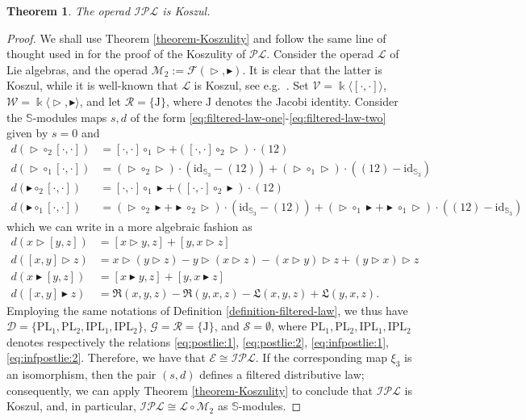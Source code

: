 \documentclass[10pt]{article}
\newtheorem {theorem} [lemma] {Theorem}
\theoremstyle{definition}
\newcommand{\wt}{\vartriangleright}
\newcommand{\bt}{\blacktriangleright}
\newcommand{\R}{\mathfrak{R}}
\renewcommand{\L}{\mathfrak{L}}
\begin{document}
\begin{theorem}\label{thm:IPL}
The operad $\mathcal{IPL}$ is Koszul.
\end{theorem}
\begin{proof}
We shall use Theorem \ref{theorem-Koszulity} and follow the same line of thought used in \cite[6.1]{DG} for the proof of the Koszulity of $\mathcal{PL}$. Consider the operad $\mathcal{L}$ of Lie algebras, and the operad $\mathcal{M}_2 := \mathcal{F}(\wt,\bt)$. It is clear that the latter is Koszul, while it is well-known that $\mathcal{L}$ is Koszul, see e.g.\ \cite[13.2.6]{LodayVallette}. Set $\mathcal{V}=\Bbbk\langle [\cdot,\cdot]\rangle$, $\mathcal{W}=\Bbbk\langle \wt,\bt \rangle$, and let $\mathcal{R}=\{ \mathrm{J}\}$, where $\mathrm{J}$ denotes the Jacobi identity. Consider the $\mathbb{S}$-modules maps $s,d$ of the form \eqref{eq:filtered-law-one}-\eqref{eq:filtered-law-two} given by $s=0$ and 
\begin{align*}
d(\wt \circ_2 [\cdot,\cdot] ) &=  [\cdot,\cdot]\circ_1 \wt + ([\cdot,\cdot]\circ_2\wt ) \cdot(12)\\
d(\wt \circ_1 [\cdot,\cdot]  ) &= (\wt \circ_2 \wt) \cdot (\mathrm{id}_{\mathbb{S}_3} - (12)) + (\wt \circ_1 \wt) \cdot ((12) -\mathrm{id}_{\mathbb{S}_3} ) \\
d(\bt \circ_2 [\cdot,\cdot] ) &=  [\cdot,\cdot]\circ_1 \bt + ([\cdot,\cdot]\circ_2\bt ) \cdot(12)\\
d(\bt\circ_1[\cdot,\cdot]  ) &= (\wt \circ_2 \bt + \bt \circ_2 \wt) \cdot (\mathrm{id}_{\mathbb{S}_3} - (12)) + (\wt \circ_1 \bt + \bt \circ_1 \wt) \cdot ((12) -\mathrm{id}_{\mathbb{S}_3} )
\end{align*}
which we can write in a more algebraic fashion as
\begin{align*}
d(x \wt [y,z]) &= [x \wt y,z] + [y,x \wt z] \\
d([x,y] \wt z )&= x \wt (y \wt z) - y \wt (x \wt z) - (x \wt y) \wt z + (y \wt x) \wt z \\
d(x \bt [y,z]) &= [x \bt y,z] + [y,x \bt z] \\
d([x,y] \bt z) &= \R(x,y,z) - \R(y,x,z) - \L(x,y,z) + \L(y,x,z).
\end{align*}
Employing the same notations of Definition \ref{definition-filtered-law}, we thus have $\mathcal{D} = \{ \mathrm{PL}_1, \mathrm{PL}_2, \mathrm{IPL}_1, \mathrm{IPL}_2\}$,  $\mathcal{G}= \mathcal{R} = \{ \mathrm{J}\}$, and $\mathcal{S}= \emptyset$, where $\mathrm{PL}_1, \mathrm{PL}_2, \mathrm{IPL}_1, \mathrm{IPL}_2$ denotes respectively the relations \eqref{eq:postlie:1}, \eqref{eq:postlie:2}, \eqref{eq:infpostlie:1}, \eqref{eq:infpostlie:2}. Therefore, we have that $\mathcal{E} \cong \mathcal{IPL}$. If the corresponding map $\xi_3$ is an isomorphism, then the pair $(s,d)$ defines a filtered distributive law; consequently, we can apply Theorem \ref{theorem-Koszulity} to conclude that $\mathcal{IPL}$ is Koszul, and, in particular, $\mathcal{IPL} \cong \mathcal{L} \circ \mathcal{M}_2$ as $\mathbb{S}$-modules.

\end{proof}
\end{document}
